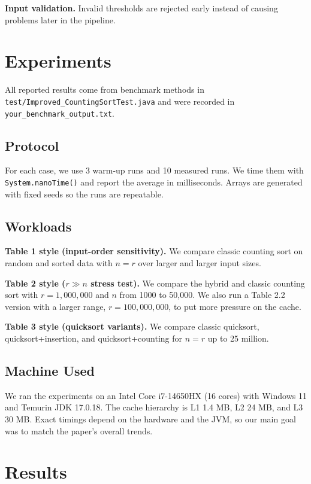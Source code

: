 \documentclass[11pt]{article}
\begin{document}
    \textbf{Input validation.} Invalid thresholds are rejected early instead of causing problems
    later in the pipeline.

    \section{Experiments}

    All reported results come from benchmark methods in
    \texttt{test/Improved\_CountingSortTest.java} and were recorded in
    \texttt{your\_benchmark\_output.txt}.

    \subsection{Protocol}

    For each case, we use 3 warm-up runs and 10 measured runs. We time them with
    \texttt{System.nanoTime()} and report the average in milliseconds. Arrays are generated with
    fixed seeds so the runs are repeatable.

    \subsection{Workloads}

    \textbf{Table 1 style (input-order sensitivity).} We compare classic counting sort on random
    and sorted data with $n=r$ over larger and larger input sizes.

    \textbf{Table 2 style ($r \gg n$ stress test).} We compare the hybrid and classic counting
    sort with $r=1{,}000{,}000$ and $n$ from 1000 to 50,000. We also run a Table 2.2 version with
    a larger range, $r=100{,}000{,}000$, to put more pressure on the cache.

    \textbf{Table 3 style (quicksort variants).} We compare classic quicksort,
    quicksort+insertion, and quicksort+counting for $n=r$ up to 25 million.

    \subsection{Machine Used}

    We ran the experiments on an Intel Core i7-14650HX (16 cores) with Windows 11 and
    Temurin JDK 17.0.18. The cache hierarchy is L1 1.4 MB, L2 24 MB, and L3 30 MB. Exact timings
    depend on the hardware and the JVM, so our main goal was to match the paper's overall trends.

    \section{Results}
\end{document}
